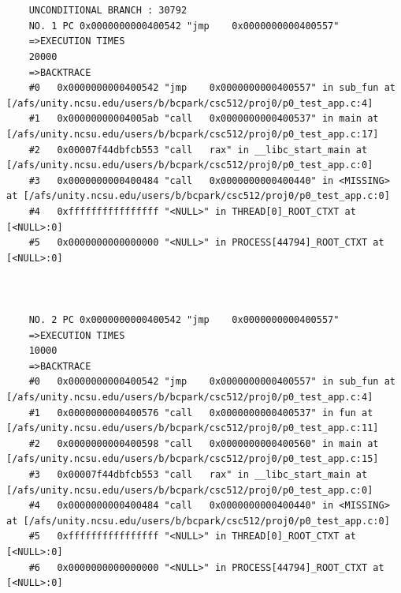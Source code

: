 \documentclass[11pt]{article}
\begin{document}
\begin{verbatim}
    
    
    UNCONDITIONAL BRANCH : 30792
    NO. 1 PC 0x0000000000400542 "jmp    0x0000000000400557"
    =>EXECUTION TIMES
    20000
    =>BACKTRACE
    #0   0x0000000000400542 "jmp    0x0000000000400557" in sub_fun at [/afs/unity.ncsu.edu/users/b/bcpark/csc512/proj0/p0_test_app.c:4]
    #1   0x00000000004005ab "call   0x0000000000400537" in main at [/afs/unity.ncsu.edu/users/b/bcpark/csc512/proj0/p0_test_app.c:17]
    #2   0x00007f44dbfcb553 "call   rax" in __libc_start_main at [/afs/unity.ncsu.edu/users/b/bcpark/csc512/proj0/p0_test_app.c:0]
    #3   0x0000000000400484 "call   0x0000000000400440" in <MISSING> at [/afs/unity.ncsu.edu/users/b/bcpark/csc512/proj0/p0_test_app.c:0]
    #4   0xffffffffffffffff "<NULL>" in THREAD[0]_ROOT_CTXT at [<NULL>:0]
    #5   0x0000000000000000 "<NULL>" in PROCESS[44794]_ROOT_CTXT at [<NULL>:0]
    
    
    
    NO. 2 PC 0x0000000000400542 "jmp    0x0000000000400557"
    =>EXECUTION TIMES
    10000
    =>BACKTRACE
    #0   0x0000000000400542 "jmp    0x0000000000400557" in sub_fun at [/afs/unity.ncsu.edu/users/b/bcpark/csc512/proj0/p0_test_app.c:4]
    #1   0x0000000000400576 "call   0x0000000000400537" in fun at [/afs/unity.ncsu.edu/users/b/bcpark/csc512/proj0/p0_test_app.c:11]
    #2   0x0000000000400598 "call   0x0000000000400560" in main at [/afs/unity.ncsu.edu/users/b/bcpark/csc512/proj0/p0_test_app.c:15]
    #3   0x00007f44dbfcb553 "call   rax" in __libc_start_main at [/afs/unity.ncsu.edu/users/b/bcpark/csc512/proj0/p0_test_app.c:0]
    #4   0x0000000000400484 "call   0x0000000000400440" in <MISSING> at [/afs/unity.ncsu.edu/users/b/bcpark/csc512/proj0/p0_test_app.c:0]
    #5   0xffffffffffffffff "<NULL>" in THREAD[0]_ROOT_CTXT at [<NULL>:0]
    #6   0x0000000000000000 "<NULL>" in PROCESS[44794]_ROOT_CTXT at [<NULL>:0]
    
    
    

\end{verbatim}
\end{document}
